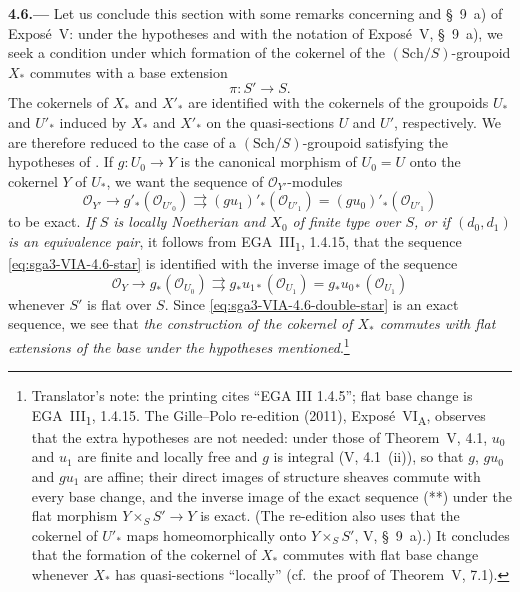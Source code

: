 \medskip
{}\label{par:sga3-VIA-4.6}%
\noindent\textbf{4.6.---}
Let us conclude this section with some remarks concerning 
and \S~9~a) of Expos\'e~V: under the hypotheses and with the notation
of Expos\'e~V, \S~9~a), we seek a condition under which formation of
the cokernel of the \((\mathrm{Sch}/S)\)-groupoid \(X_*\) commutes
with a base extension
\[
  \pi:S'\longrightarrow S.
\]
The cokernels of \(X_*\) and \(X'_*\) are identified with the
cokernels of the groupoids \(U_*\) and \(U'_*\) induced by \(X_*\)
and \(X'_*\) on the quasi-sections \(U\) and \(U'\), respectively.
We are therefore reduced to the case of a
\((\mathrm{Sch}/S)\)-groupoid satisfying the hypotheses of
. If \(g:U_0\to Y\) is the canonical morphism of
\(U_0=U\) onto the cokernel \(Y\) of \(U_*\), we want the sequence of
\(\mathcal O_{Y'}\)-modules
\[
  \tag{*}\label{eq:sga3-VIA-4.6-star}
  \mathcal O_{Y'}
    \longrightarrow g'_*(\mathcal O_{U'_0})
    \rightrightarrows
  (gu_1)'_*(\mathcal O_{U'_1})
    =
  (gu_0)'_*(\mathcal O_{U'_1})
\]
to be exact. \emph{If \(S\) is locally Noetherian and \(X_0\) of finite type
over \(S\), or if \((d_0,d_1)\) is an equivalence pair}, it follows from
EGA~III\textsubscript{1}, 1.4.15, that the sequence \eqref{eq:sga3-VIA-4.6-star} is identified with
the inverse image of the sequence
\[
  \tag{**}\label{eq:sga3-VIA-4.6-double-star}
  \mathcal O_Y
    \longrightarrow g_*(\mathcal O_{U_0})
    \rightrightarrows
  g_*u_{1*}(\mathcal O_{U_1})
    =
  g_*u_{0*}(\mathcal O_{U_1})
\]
whenever \(S'\) is flat over \(S\). Since \eqref{eq:sga3-VIA-4.6-double-star} is an exact sequence,
we see that \emph{the construction of the cokernel of \(X_*\) commutes with
flat extensions of the base under the hypotheses mentioned}.\footnote{Translator's note: the printing cites ``EGA III 1.4.5''; flat base
change is EGA~III\textsubscript{1}, 1.4.15. The Gille--Polo re-edition (2011), Exposé~VI\textsubscript{A},
observes that the extra hypotheses are not needed: under those of Theorem~V, 4.1, \(u_0\) and \(u_1\)
are finite and locally free and \(g\) is integral (V, 4.1~(ii)), so that \(g\), \(gu_0\) and \(gu_1\)
are affine; their direct images of structure sheaves commute with every base change, and the inverse
image of the exact sequence (**) under the flat morphism \(Y\times_SS'\to Y\) is exact. (The re-edition
also uses that the cokernel of \(U'_*\) maps homeomorphically onto \(Y\times_SS'\), V, \S~9~a).) It
concludes that the formation of the cokernel of \(X_*\) commutes with flat base change whenever
\(X_*\) has quasi-sections ``locally'' (cf.\ the proof of Theorem~V, 7.1).}
